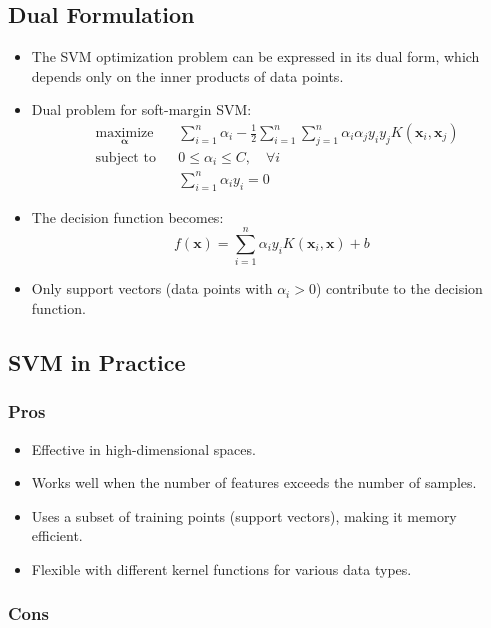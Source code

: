 \documentclass{article}
\begin{document}
\subsection{Dual Formulation}

\begin{itemize}
    \item The SVM optimization problem can be expressed in its dual form, which depends only on the inner products of data points.
    \item Dual problem for soft-margin SVM:
    \[
    \begin{aligned}
    & \underset{\boldsymbol{\alpha}}{\text{maximize}} && \sum_{i=1}^n \alpha_i - \frac{1}{2} \sum_{i=1}^n \sum_{j=1}^n \alpha_i \alpha_j y_i y_j K(\mathbf{x}_i, \mathbf{x}_j) \\
    & \text{subject to} && 0 \leq \alpha_i \leq C, \quad \forall i \\
    &&& \sum_{i=1}^n \alpha_i y_i = 0
    \end{aligned}
    \]
    \item The decision function becomes:
    \[
    f(\mathbf{x}) = \sum_{i=1}^n \alpha_i y_i K(\mathbf{x}_i, \mathbf{x}) + b
    \]
    \item Only support vectors (data points with $\alpha_i > 0$) contribute to the decision function.
\end{itemize}

\subsection{SVM in Practice}

\subsubsection{Pros}

\begin{itemize}
    \item Effective in high-dimensional spaces.
    \item Works well when the number of features exceeds the number of samples.
    \item Uses a subset of training points (support vectors), making it memory efficient.
    \item Flexible with different kernel functions for various data types.
\end{itemize}

\subsubsection{Cons}
\end{document}
